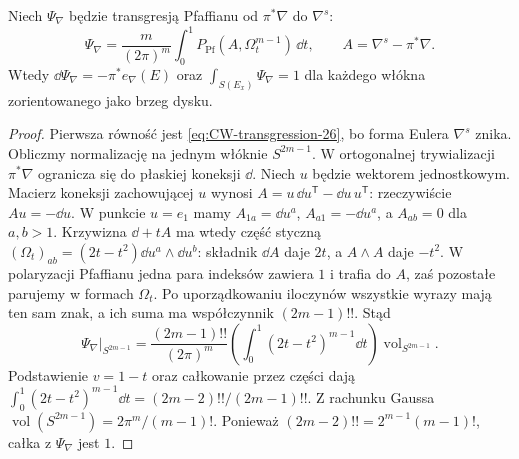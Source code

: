 \begin{lemat}
\label{lem:angular-form-26}
Niech $\Psi_\nabla$ będzie transgresją
Pfaffianu od $\pi^*\nabla$ do $\nabla^s$:
\[
 \Psi_\nabla=
 \frac{m}{(2\pi)^m}\int_0^1
 P_{\operatorname{Pf}}(A,\Omega_t^{m-1})\,\dd t,
 \qquad A=\nabla^s-\pi^*\nabla.
\]
Wtedy
$\dd\Psi_\nabla=-\pi^*e_\nabla(E)$
oraz $\int_{S(E_x)}\Psi_\nabla=1$
dla każdego włókna zorientowanego
jako brzeg dysku.
\end{lemat}
\begin{proof}
Pierwsza równość jest
\eqref{eq:CW-transgression-26},
bo forma Eulera $\nabla^s$ znika.
Obliczmy normalizację na jednym
włóknie $S^{2m-1}$. W ortogonalnej
trywializacji $\pi^*\nabla$ ogranicza
się do płaskiej koneksji $\dd$.
Niech $u$ będzie wektorem jednostkowym.
Macierz koneksji zachowującej $u$
wynosi
$A=u\,\dd u^{\mathsf T}-\dd u\,u^{\mathsf T}$:
rzeczywiście $Au=-\dd u$.
W punkcie $u=e_1$ mamy
$A_{1a}=\dd u^a$, $A_{a1}=-\dd u^a$,
a $A_{ab}=0$ dla $a,b>1$.
Krzywizna $\dd+tA$ ma wtedy
część styczną
$(\Omega_t)_{ab}=(2t-t^2)
\dd u^a\wedge\dd u^b$:
składnik $\dd A$ daje $2t$,
a $A\wedge A$ daje $-t^2$.
W polaryzacji Pfaffianu jedna
para indeksów zawiera $1$ i
trafia do $A$, zaś pozostałe
parujemy w formach $\Omega_t$.
Po uporządkowaniu iloczynów
wszystkie wyrazy mają ten sam znak,
a ich suma ma współczynnik
$(2m-1)!!$. Stąd
\[
 \Psi_\nabla|_{S^{2m-1}}
 =\frac{(2m-1)!!}{(2\pi)^m}
 \left(\int_0^1(2t-t^2)^{m-1}\dd t\right)
 \operatorname{vol}_{S^{2m-1}}.
\]
Podstawienie $v=1-t$ oraz
całkowanie przez części dają
$\int_0^1(2t-t^2)^{m-1}\dd t
=(2m-2)!!/(2m-1)!!$.
Z rachunku Gaussa
$\operatorname{vol}(S^{2m-1})
=2\pi^m/(m-1)!$.
Ponieważ
$(2m-2)!!=2^{m-1}(m-1)!$,
całka z $\Psi_\nabla$ jest $1$.
\end{proof}

